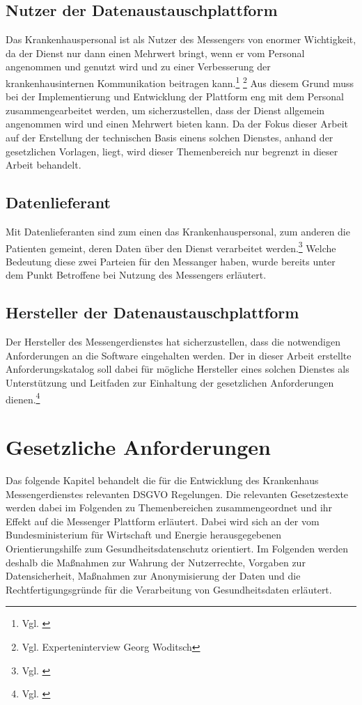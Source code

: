 \subsection{Nutzer der Datenaustauschplattform}\label{subsection:ndd}
Das Krankenhauspersonal ist als Nutzer des Messengers von enormer Wichtigkeit, da der Dienst nur dann einen Mehrwert bringt, wenn er vom Personal angenommen und genutzt wird und zu einer Verbesserung der krankenhausinternen Kommunikation beitragen kann.\footnote{Vgl. \cite[S. 13]{Bundesverband-Gesundheits-IT-e.V.2016}}
\footnote{Vgl. Experteninterview Georg Woditsch} Aus diesem Grund muss bei der Implementierung und Entwicklung der Plattform eng mit dem Personal zusammengearbeitet werden, um sicherzustellen, dass der Dienst allgemein angenommen wird und einen Mehrwert bieten kann. Da der Fokus dieser Arbeit auf der Erstellung der technischen Basis einens solchen Dienstes, anhand der gesetzlichen Vorlagen, liegt, wird dieser Themenbereich nur begrenzt in dieser Arbeit behandelt. 

\subsection{Datenlieferant}\label{subsection:hdd}
Mit Datenlieferanten sind zum einen das Krankenhauspersonal, zum anderen die Patienten gemeint, deren Daten über den Dienst verarbeitet werden.\footnote{Vgl. \cite[S. 13]{Bundesverband-Gesundheits-IT-e.V.2016}} Welche Bedeutung diese zwei Parteien für den Messanger haben, wurde bereits unter dem Punkt \glqq Betroffene bei Nutzung des Messengers\grqq{} erläutert.

\subsection{Hersteller der Datenaustauschplattform}\label{subsection:hdd}
Der Hersteller des Messengerdienstes hat sicherzustellen, dass die notwendigen Anforderungen an die Software eingehalten werden.
Der in dieser Arbeit erstellte Anforderungskatalog soll dabei für mögliche Hersteller eines solchen Dienstes als Unterstützung und Leitfaden zur Einhaltung der gesetzlichen Anforderungen dienen.\footnote{Vgl. \cite[S. 13]{Bundesverband-Gesundheits-IT-e.V.2016}}

\section{Gesetzliche Anforderungen}\label{section:dsgvo}
Das folgende Kapitel behandelt die für die Entwicklung des Krankenhaus Messengerdienstes relevanten DSGVO Regelungen. Die relevanten Gesetzestexte werden dabei im Folgenden zu Themenbereichen zusammengeordnet und ihr Effekt auf die Messenger Plattform erläutert. Dabei wird sich an der vom Bundesministerium für Wirtschaft und Energie herausgegebenen Orientierungshilfe zum Gesundheitsdatenschutz orientiert. Im Folgenden werden deshalb die Maßnahmen zur Wahrung der Nutzerrechte, Vorgaben zur Datensicherheit, Maßnahmen zur Anonymisierung der Daten und die Rechtfertigungsgründe für die Verarbeitung von Gesundheitsdaten erläutert.

